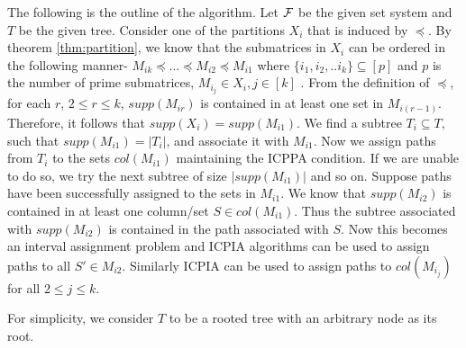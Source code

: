 \documentclass{llncs}
\def\cF{{\cal F}}
\begin{document}
The
 following is the outline of the algorithm. Let $\cF$
be the given set system and $T$ be the given tree.  Consider one of
the partitions $X_i$ that is induced by $\preccurlyeq$. By theorem
\ref{thm:partition}, we know that the submatrices in $X_i$ can be
ordered in the following manner- $M_{ik} \preccurlyeq ... \preccurlyeq
M_{i2} \preccurlyeq M_{i1}$ where $\{i_1, i_2, .. i_k\} \subseteq [p]$
and $p$ is the number of prime submatrices, $M_{i_j} \in X_i, j \in
[k]$ . From the definition of $\preccurlyeq$, for each $r$, $2 \leq r
\leq k$, $supp(M_{ir})$ is contained in at least one set in
$M_{i(r-1)}$.  Therefore, it follows that $supp(X_i) = supp(M_{i1})$.
We find a subtree $T_i \subseteq T$, such that $supp(M_{i1}) = |T_i|$,
and associate it with $M_{i1}$. Now we assign paths from $T_i$ to the
sets $col(M_{i1})$ maintaining the ICPPA condition. If we are unable to do so,
we try the next subtree of size $|supp(M_{i1})|$ and so on. Suppose paths
have been successfully assigned to the sets in $M_{i1}$. We know that
$supp(M_{i2}) $ is contained in at least one column/set $S \in
col(M_{i1})$. 
Thus the subtree associated with $supp(M_{i2}) $ is
contained in the path associated with $S$.
Now this becomes an interval assignment problem and ICPIA
algorithms can be used to assign paths to all $S' \in
M_{i2}$. Similarly ICPIA can be used to assign paths to $col(M_{i_j})$
for all $2 \le j \le k$.

For simplicity, we consider $T$ to be a rooted tree with an arbitrary
node as its root.
\end{document}
